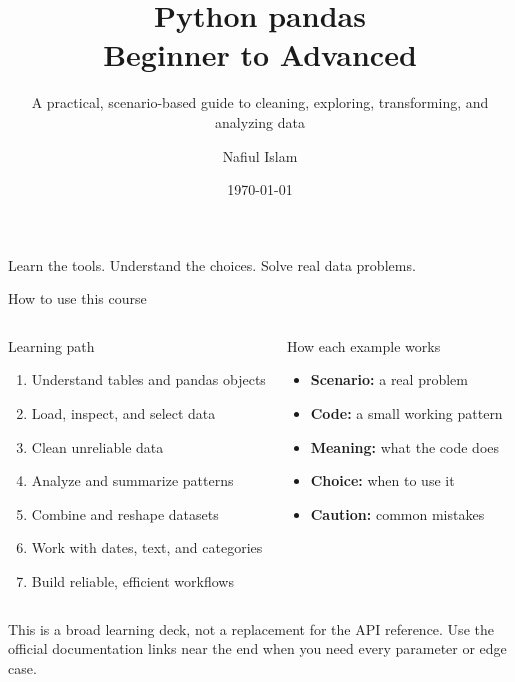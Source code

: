 \documentclass[aspectratio=169,10pt]{beamer}
\title[Pandas: Beginner to Advanced]{Python pandas\\Beginner to Advanced}
\subtitle{A practical, scenario-based guide to cleaning, exploring, transforming, and analyzing data}
\author{Nafiul Islam}
\institute{BSDS \\ United International University}
\date{\today}
\begin{document}
\begin{frame}
  \titlepage
  \vspace{-0.6em}
  \begin{center}
    \small\textcolor{Muted}{Learn the tools. Understand the choices. Solve real data problems.}
  \end{center}
\end{frame}

\begin{frame}[fragile]{How to use this course}
\begin{columns}[T,onlytextwidth]
\begin{block}{Learning path}
\begin{enumerate}
\item Understand tables and pandas objects
\item Load, inspect, and select data
\item Clean unreliable data
\item Analyze and summarize patterns
\item Combine and reshape datasets
\item Work with dates, text, and categories
\item Build reliable, efficient workflows
\end{enumerate}
\end{block}
\begin{block}{How each example works}
\begin{itemize}
\item \textbf{Scenario:} a real problem
\item \textbf{Code:} a small working pattern
\item \textbf{Meaning:} what the code does
\item \textbf{Choice:} when to use it
\item \textbf{Caution:} common mistakes
\end{itemize}
\end{block}
\end{columns}
\small This is a broad learning deck, not a replacement for the API reference. Use the official documentation links near the end when you need every parameter or edge case.
\end{frame}
\end{document}

